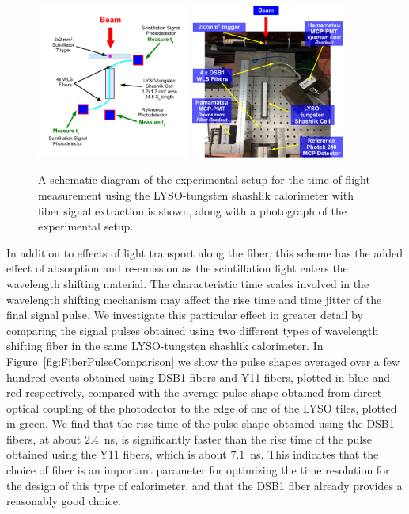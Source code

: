 \documentclass[12pt]{article}
\begin{document}
\begin{figure}[H] \centering
\includegraphics[width=0.45\textwidth]{figs/ShashlikFiberSetupSchematic} 
\includegraphics[width=0.45\textwidth]{figs/ShashlikFiberSetupPhoto} 
\caption{ A schematic diagram of the experimental setup for the
time of flight measurement using the LYSO-tungsten shashlik calorimeter
with fiber signal extraction is shown, along with a photograph of the
experimental setup. } 
\label{fig:ShashlikFiberSetup}
\end{figure}

In addition to effects of light transport along the fiber, 
this scheme has the added effect of absorption and re-emission as 
the scintillation light enters the wavelength shifting material. 
The characteristic time scales involved in the wavelength shifting 
mechanism may affect the rise time and time jitter of the final signal 
pulse. We investigate this particular effect in greater detail by
comparing the signal pulses obtained using two different types
of wavelength shifting fiber in the same LYSO-tungsten shashlik
calorimeter. In Figure~\ref{fig:FiberPulseComparison} we show
the pulse shapes averaged over a few hundred events obtained 
using DSB1 fibers and Y11 fibers, plotted in blue and red respectively,
compared with the average pulse shape obtained from direct optical 
coupling of the photodector to the edge of one of the LYSO tiles, plotted in green.
We find that the rise time of the pulse shape obtained using the 
DSB1 fibers, at about $2.4$~ns, is significantly faster than the rise time
of the pulse obtained using the Y11 fibers, which is about $7.1$~ns. This indicates
that the choice of fiber is an important parameter for 
optimizing the time resolution for the design of 
this type of calorimeter, and that the DSB1 fiber 
already provides a reasonably good choice.
\end{document}
